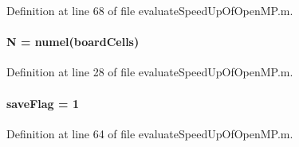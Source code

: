 Definition at line 68 of file evaluate\+Speed\+Up\+Of\+Open\+M\+P.\+m.

\hypertarget{a00100_a8cc2e7240164328fdc3f0e5e21032c56}{}
\paragraph[{N}]{\setlength{\rightskip}{0pt plus 5cm}N = numel({\bf board\+Cells})}\label{a00100_a8cc2e7240164328fdc3f0e5e21032c56}


Definition at line 28 of file evaluate\+Speed\+Up\+Of\+Open\+M\+P.\+m.

\hypertarget{a00100_ae484b320b0f28c87f6742b7c5ee9e80d}{}
\paragraph[{save\+Flag}]{\setlength{\rightskip}{0pt plus 5cm}save\+Flag = 1}\label{a00100_ae484b320b0f28c87f6742b7c5ee9e80d}


Definition at line 64 of file evaluate\+Speed\+Up\+Of\+Open\+M\+P.\+m.

